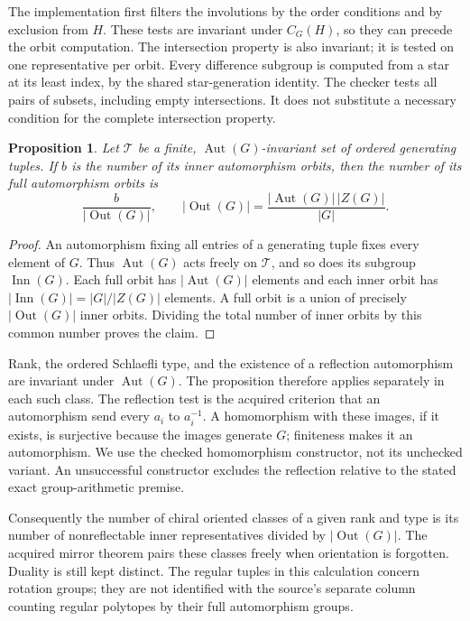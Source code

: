 \documentclass[11pt,a4paper]{article}
\newtheorem{proposition}{Proposition}
\newcommand{\Aut}{\operatorname{Aut}}
\newcommand{\Inn}{\operatorname{Inn}}
\newcommand{\Out}{\operatorname{Out}}
\begin{document}
The implementation first filters the involutions by the order
conditions and by exclusion from $H$. These tests are invariant under
$C_G(H)$, so they can precede the orbit computation. The intersection
property is also invariant; it is tested on one representative per
orbit. Every difference subgroup is computed from a star at its least
index, by the shared star-generation identity. The checker tests all
pairs of subsets, including empty intersections. It does not substitute
a necessary condition for the complete intersection property.

\begin{proposition}
Let $\mathcal T$ be a finite, $\Aut(G)$-invariant set of ordered
generating tuples. If $b$ is the number of its inner automorphism orbits,
then the number of its full automorphism orbits is
\[
\frac{b}{|\Out(G)|},\qquad
|\Out(G)|=\frac{|\Aut(G)|\,|Z(G)|}{|G|}.
\]
\end{proposition}
\begin{proof}
An automorphism fixing all entries of a generating tuple fixes every
element of $G$. Thus $\Aut(G)$ acts freely on $\mathcal T$, and so does
its subgroup $\Inn(G)$. Each full orbit has $|\Aut(G)|$ elements and
each inner orbit has $|\Inn(G)|=|G|/|Z(G)|$ elements. A full orbit is
a union of precisely $|\Out(G)|$ inner orbits. Dividing the total
number of inner orbits by this common number proves the claim.
\end{proof}

Rank, the ordered Schlaefli type, and the existence of a reflection
automorphism are invariant under $\Aut(G)$. The proposition therefore
applies separately in each such class. The reflection test is the
acquired criterion that an automorphism send every $a_i$ to $a_i^{-1}$.
A homomorphism with these images, if it exists, is surjective because
the images generate $G$; finiteness makes it an automorphism. We use
the checked homomorphism constructor, not its unchecked variant.
An unsuccessful constructor excludes the reflection relative to the
stated exact group-arithmetic premise.

Consequently the number of chiral oriented classes of a given rank and
type is its number of nonreflectable inner representatives divided by
$|\Out(G)|$. The acquired mirror theorem pairs these classes freely
when orientation is forgotten. Duality is still kept distinct.
The regular tuples in this calculation concern rotation groups;
they are not identified with the source's separate column counting
regular polytopes by their full automorphism groups.
\end{document}
